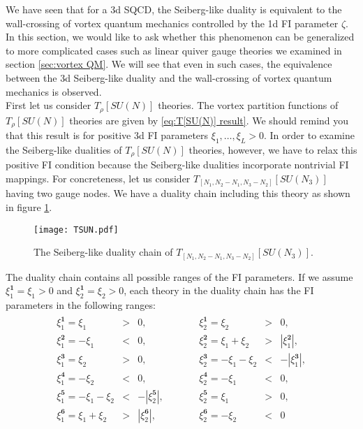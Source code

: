 \documentclass[a4paper,11pt]{article}
\begin{document}
We have seen that for a 3d SQCD, the Seiberg-like duality is equivalent to the wall-crossing of vortex quantum mechanics controlled by the 1d FI parameter $\zeta$. In this section, we would like to ask whether this phenomenon can be generalized to more complicated cases such as linear quiver gauge theories we examined in section \ref{sec:vortex QM}. We will see that even in such cases, the equivalence between the 3d Seiberg-like duality and the wall-crossing of vortex quantum mechanics is observed.
\\


First let us consider $T_\rho [SU(N)]$ theories. The vortex partition functions of $T_\rho [SU(N)]$ theories are given by \eqref{eq:T[SU(N)] result}. We should remind you that this result is for positive 3d FI parameters $\xi_1,\ldots,\xi_{L} > 0$. In order to examine the Seiberg-like dualities of $T_\rho [SU(N)]$ theories, however, we have to relax this positive FI condition because the Seiberg-like dualities incorporate nontrivial FI mappings. For concreteness, let us consider $T_{[N_1,N_2-N_1,N_3-N_2]} [SU(N_3)]$ having two gauge nodes. We have a duality chain including this theory as shown in figure \ref{fig:T[SU(N)]}.
%
\begin{figure}[tbp]
\centering %
\texttt{[image: TSUN.pdf]}
\caption{\label{fig:T[SU(N)]} The Seiberg-like duality chain of $T_{[N_1,N_2-N_1,N_3-N_2]} [SU(N_3)]$.}
\end{figure}
%
The duality chain contains all possible ranges of the FI parameters. If we assume $\xi^{\mathbf 1}_1 = \xi_1 > 0$ and $\xi^{\mathbf 1}_2 = \xi_2 > 0$, each theory in the duality chain has the FI parameters in the following ranges:
\begin{align}
\label{eq:FI map}
\begin{array}{lccclcc}
\xi^{\mathbf 1}_1 = \xi_1  &>& 0, &\qquad& \xi^{\mathbf 1}_2 = \xi_2  &>& 0, \\
\xi^{\mathbf 2}_1 = -\xi_1  &<& 0, &\qquad& \xi^{\mathbf 2}_2 = \xi_1+\xi_2  &>& |\xi^{\mathbf 2}_1|, \\
\xi^{\mathbf 3}_1 = \xi_2  &>& 0, &\qquad& \xi^{\mathbf 3}_2 = -\xi_1-\xi_2  &<& -|\xi^{\mathbf 3}_1|, \\
\xi^{\mathbf 4}_1 = -\xi_2  &<& 0, &\qquad& \xi^{\mathbf 4}_2 = -\xi_1  &<& 0, \\
\xi^{\mathbf 5}_1 = -\xi_1-\xi_2  &<& -|\xi^{\mathbf 5}_2|, &\qquad& \xi^{\mathbf 5}_2 = \xi_1  &>& 0, \\
\xi^{\mathbf 6}_1 = \xi_1+\xi_2  &>& |\xi^{\mathbf 6}_2|, &\qquad& \xi^{\mathbf 6}_2 = -\xi_2  &<& 0 \\
\end{array}
\end{align}
\end{document}
